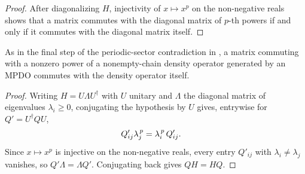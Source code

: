 \begin{proof}\leanok
    After diagonalizing $H$, injectivity of $x\mapsto x^p$ on the
    non-negative reals shows that a matrix commutes with the diagonal matrix of
    $p$-th powers if and only if it commutes with the diagonal matrix itself.
\end{proof}

\begin{lemma}
    \label{thm:psd_commute_of_commute_pow}
    \leanok
    As in the final step of the periodic-sector contradiction in
    \cite[Proposition~4.13]{Cirac2016MPDO_arXiv}, a matrix commuting with a
    nonzero power of a nonempty-chain density operator generated by an MPDO
    commutes with the density operator itself.
\end{lemma}

\begin{proof}
    \leanok
    Writing $H=U\Lambda U^\dagger$ with $U$ unitary and $\Lambda$ the
    diagonal matrix of eigenvalues $\lambda_i\geq0$, conjugating the
    hypothesis by $U$ gives, entrywise for $Q'=U^\dagger QU$,
    \begin{align}
        Q'_{ij} \lambda_j^{\,p}
         & =\lambda_i^{\,p}\,Q'_{ij}.
        \notag
    \end{align}
    Since $x\mapsto x^p$ is injective on the non-negative reals, every entry
    $Q'_{ij}$ with $\lambda_i\neq\lambda_j$ vanishes, so
    $Q'\Lambda=\Lambda Q'$. Conjugating back gives $QH=HQ$.
\end{proof}
